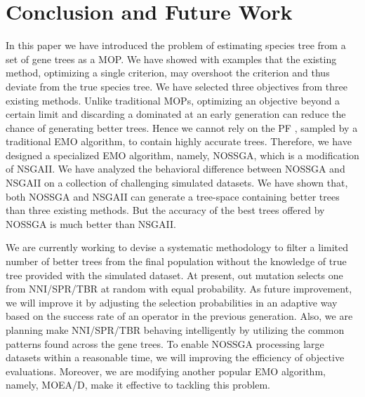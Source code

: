 \section{Conclusion and Future Work}
In this paper we have introduced the problem of estimating species tree from a set of gene trees as a MOP. We have showed with examples that the existing method, optimizing a single criterion, may overshoot the criterion and thus deviate from the true species tree. We have selected three objectives from three existing methods. Unlike traditional MOPs, optimizing an objective beyond a certain limit and discarding a dominated at an early generation can reduce the chance of generating better trees. Hence we cannot rely on the PF , sampled by a traditional EMO algorithm, to contain highly accurate trees. Therefore, we have designed a specialized EMO algorithm, namely, NOSSGA, which is a modification of NSGAII. %
We have analyzed the behavioral difference between NOSSGA and NSGAII on a collection of challenging simulated datasets. We have shown that, both NOSSGA and NSGAII can generate a tree-space containing better trees than three existing methods. But the accuracy of the best trees offered by NOSSGA is much better than NSGAII.


We are currently working to devise a systematic methodology to filter a limited number of better trees from the final population without the knowledge of true tree provided with the simulated dataset. At present, out mutation selects one from NNI/SPR/TBR at random with equal probability. As future improvement, we will improve it by adjusting the selection probabilities in an adaptive way based on the success rate of an operator in the previous generation. Also, we are planning make NNI/SPR/TBR behaving intelligently by utilizing the common patterns found across the gene trees. To enable NOSSGA processing large datasets within a reasonable time, we will improving the efficiency of objective evaluations. Moreover, we are modifying another popular EMO algorithm, namely, MOEA/D, make it effective to tackling this problem.